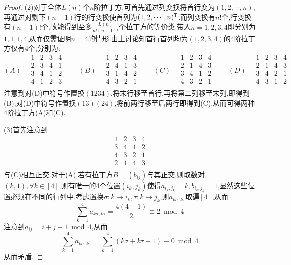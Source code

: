 \documentclass{article}
\begin{document}
\begin{proof}
    (2)对于全体$L(n)$个$n$阶拉丁方,可首先通过列变换将首行变为$(1,2,\cdots,n)$,再通过对剩下$(n-1)$行的行变换使首列为$(1,2,\cdots,n)^{\mathsf{T}}$.而列变换有$n!$个,行变换有$(n-1)!$个,故能得到至多$\frac{L(n)}{n!(n-1)!}$个拉丁方的等价类,带入$n=1,2,3,4$即分别为$1,1,1,4$,从而仅需证明$n=4$的情形.由上讨论知首行首列均为$(1,2,3,4)$的4阶拉丁方仅有4个,分别为:
    $$(A)\quad\begin{matrix}
        1 & 2 & 3 & 4 \\
        2 & 3 & 4 & 1 \\
        3 & 4 & 1 & 2 \\
        4 & 1 & 2 & 3 \\
    \end{matrix}\qquad (B)\quad\begin{matrix}
        1 & 2 & 3 & 4 \\
        2 & 4 & 1 & 3 \\
        3 & 1 & 4 & 2 \\
        4 & 3 & 2 & 1 \\
    \end{matrix}\qquad (C)\quad\begin{matrix}
        1 & 2 & 3 & 4 \\
        2 & 1 & 4 & 3 \\
        3 & 4 & 1 & 2 \\
        4 & 3 & 2 & 1 \\
    \end{matrix}\qquad (D)\quad\begin{matrix}
        1 & 2 & 3 & 4 \\
        2 & 1 & 4 & 3 \\
        3 & 4 & 2 & 1 \\
        4 & 3 & 1 & 2 \\
    \end{matrix}$$
    注意到对(D)中符号作置换$(1234)$,将末行移至首行,再将第二列移至末列,即得到(B);对(D)中符号作置换$(13)(24)$,将前两行移至后两行即得到(C).从而可得两种4阶拉丁方(A)和(C).

    (3)首先注意到
    $$\begin{matrix}
        1 & 2 & 3 & 4 \\
        3 & 4 & 1 & 2 \\
        4 & 3 & 2 & 1 \\
        2 & 1 & 4 & 3 \\
    \end{matrix}$$
    与(C)相互正交.对于(A),若有拉丁方$B=(b_{ij})$与其正交,则取数对$(k,1), \forall k\in [4]$,则有唯一的4个位置$(i_k,j_k)$使得$a_{i_k,j_k}=k, b_{i_k,j_k}=1$,显然这些位置必须在不同的行列中.考虑置换$\sigma:k\mapsto i_k, \tau:k\mapsto j_k$,则$a_{k\sigma,k\tau}$取遍$[4]$,从而
    $$\sum_{k=1}^{4}a_{k\sigma,k\tau}=\frac{4(4+1)}{2}\equiv 2\bmod 4$$
    注意到$a_{ij}=i+j-1\bmod 4$,从而
    $$\sum_{k=1}^{4}a_{k\sigma,k\tau}=\sum_{k=1}^{4}(k\sigma+k\tau-1)\equiv 0\bmod 4$$
    从而矛盾.
\end{proof}
\end{document}
